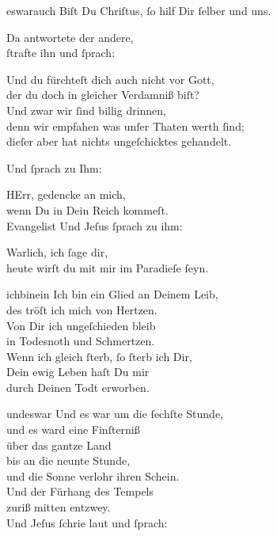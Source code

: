 \documentclass[tocstyle=ref-genre]{ees}
\begin{document}
{\begin{movement}{eswarauch}
  \voice[Uebelthäter I]
  Biſt Du Chriſtus, ſo hilf Dir ſelber und uns.

  \voice[Evangelist]
  Da antwortete der andere,\\
  ſtrafte ihn und ſprach:

  \voice[Uebelthäter II]
  Und du fürchteſt dich auch nicht vor Gott,\\
  der du doch in gleicher Verdamniß biſt?\\
  Und zwar wir ſind billig drinnen,\\
  denn wir empfahen was unſer Thaten werth ſind;\\
  dieſer aber hat nichts ungeſchicktes gehandelt.

  \voice[Evangelist]
  Und ſprach zu Ihm:

  \voice[Uebelthäter II]
  HErr, gedencke an mich,\\
  wenn Du in Dein Reich kommeſt.\\
  Evangelist Und Jeſus ſprach zu ihm:

  \voice[Jesus]
  Warlich, ich ſage dir,\\
  heute wirſt du mit mir im Paradieſe ſeyn.
\end{movement}

\begin{movement}{ichbinein}
  \voice[Chor]
  Ich bin ein Glied an Deinem Leib,\\
  des tröſt ich mich von Hertzen.\\
  Von Dir ich ungeſchieden bleib\\
  in Todesnoth und Schmertzen.\\
  Wenn ich gleich ſterb, ſo ſterb ich Dir,\\
  Dein ewig Leben haſt Du mir\\
  durch Deinen Todt erworben.
\end{movement}

\begin{movement}{undeswar}
  \voice[Evangelist]
  Und es war um die ſechſte Stunde,\\
  und es ward eine Finſterniß\\
  über das gantze Land\\
  bis an die neunte Stunde,\\
  und die Sonne verlohr ihren Schein.\\
  Und der Fürhang des Tempels\\
  zuriß mitten entzwey.\\
  Und Jeſus ſchrie laut und ſprach:


\end{movement}}
\end{document}

